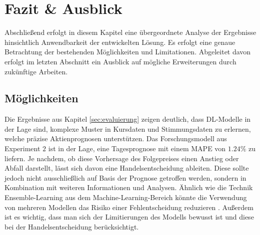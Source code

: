\newpage
\section{Fazit \& Ausblick}
Abschließend erfolgt in diesem Kapitel eine übergeordnete Analyse der Ergebnisse hinsichtlich Anwendbarkeit der entwickelten Lösung. Es erfolgt eine genaue Betrachtung der bestehenden Möglichkeiten und Limitationen. Abgeleitet davon erfolgt im letzten Abschnitt ein Ausblick auf mögliche Erweiterungen durch zukünftige Arbeiten. 

\subsection{Möglichkeiten}\label{sec:evaluierung_chance}
Die Ergebnisse aus Kapitel \ref{sec:evaluierung} zeigen deutlich, dass \ac{DL}-Modelle in der Lage sind, komplexe Muster in Kursdaten und Stimmungsdaten zu erlernen, welche präzise Aktienprognosen unterstützen. Das Forschungsmodell aus Experiment $2$ ist in der Lage, eine Tagesprognose mit einem \ac{MAPE} von $1.24\%$ zu liefern. Je nachdem, ob diese Vorhersage des Folgepreises einen Anstieg oder Abfall darstellt, lässt sich davon eine Handelsentscheidung ableiten. Diese sollte jedoch nicht ausschließlich auf Basis der Prognose getroffen werden, sondern in Kombination mit weiteren Informationen und Analysen. Ähnlich wie die Technik Ensemble-Learning aus dem Machine-Learning-Bereich könnte die Verwendung von mehreren Modellen das Risiko einer Fehlentscheidung reduzieren \autocite{wu2021ensemble}. Außerdem ist es wichtig, dass man sich der Limitierungen des Modells bewusst ist und diese bei der Handelsentscheidung berücksichtigt.


